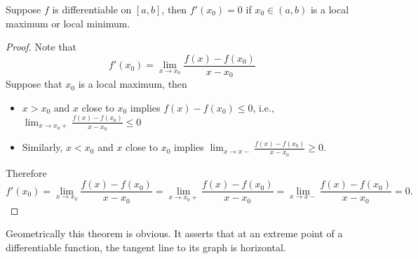 \begin{theorem}
Suppose $f$ is differentiable on $[a,b]$, then $f'(x_0)=0$ if $x_0\in (a,b)$ is a local maximum or local minimum.
\end{theorem}
\begin{proof}
Note that
\[
f'(x_0)=\lim_{x\to x_0}\frac{f(x) - f(x_0)}{x-x_0}
\]
Suppose that $x_0$ is a local maximum, then
\begin{itemize}
\item
$x>x_0$ and $x$ close to $x_0$ implies $f(x) -f(x_0)\le0$, i.e., $\lim_{x\to x_0+}\frac{f(x) - f(x_0)}{x-x_0}\le0$
\item
Similarly, $x<x_0$ and $x$ close to $x_0$ implies $\lim_{x\to x-}\frac{f(x) - f(x_0)}{x-x_0}\ge0$.
\end{itemize}
Therefore 
\[
f'(x_0)=\lim_{x\to x_0}\frac{f(x) - f(x_0)}{x-x_0}=
\lim_{x\to x_0+}\frac{f(x) - f(x_0)}{x-x_0}
=
\lim_{x\to x-}\frac{f(x) - f(x_0)}{x-x_0}=0.
\]
\end{proof}
\begin{remark}
Geometrically this theorem is obvious. It asserts that at an extreme point of a differentiable function, the tangent line to its graph is horizontal.
\end{remark}


